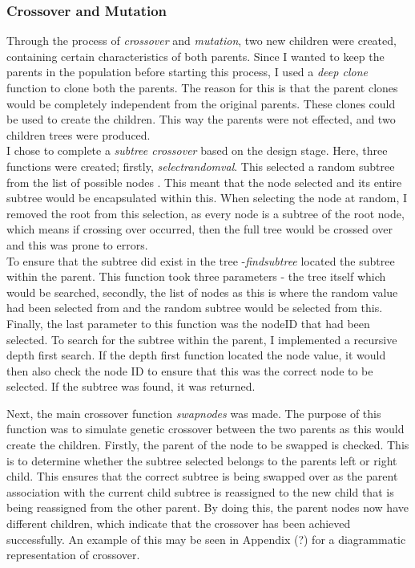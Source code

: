 \documentclass[11pt]{article}
\begin{document}
\subsubsection{Crossover and Mutation}
Through the process of \textit{crossover} and \textit{mutation}, two new children were created, containing certain characteristics of both parents. Since I wanted to keep the parents in the population before starting this process, I used a \textit{deep clone} function to clone both the parents. The reason for this is that the parent clones would be completely independent from the original parents. These clones could be used to create the children. This way the parents were not effected, and two children trees were produced. 
\\
I chose to complete a \textit{subtree crossover} based on the design stage. Here, three functions were created; firstly, \textit{select\textunderscore random\textunderscore val}. This selected a random subtree from the list of possible nodes . This meant that the node selected and its entire subtree would be encapsulated within this. When selecting the node at random, I removed the root from this selection, as every node is a subtree of the root node, which means if crossing over occurred, then the full tree would be crossed over and this was prone to errors. \\

To ensure that the subtree did exist in the tree -\textit{find\textunderscore subtree} located the subtree within the parent. This function took three parameters - the tree itself which would be searched, secondly, the list of nodes as this is where the random value had been selected from and the random subtree would be selected from this. Finally, the last parameter to this function was the nodeID that had been selected. To search for the subtree within the parent, I implemented a recursive depth first search. If the depth first function located the node value, it would then also check the node ID to ensure that this was the correct node to be selected. If the subtree was found, it was returned.

Next, the main crossover function \textit{swap\textunderscore nodes} was made. The purpose of this function was to simulate genetic crossover between the two parents as this would create the children. Firstly, the parent of the node to be swapped is checked. This is to determine whether the subtree selected belongs to the parents left or right child. This ensures that the correct subtree is being swapped over as the parent association with the current child subtree is reassigned to the new child that is being reassigned from the other parent. By doing this, the parent nodes now have different children, which indicate that the crossover has been achieved successfully. An example of this may be seen in Appendix (?) for a diagrammatic representation of crossover. 
\end{document}
